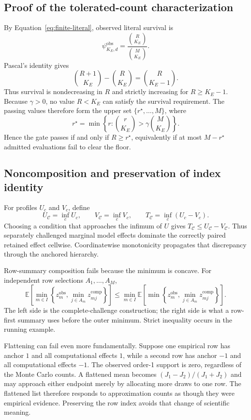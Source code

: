 \documentclass[11pt]{article}
\newcommand{\CSet}{\mathcal{C}}
\newcommand{\E}{\mathbb{E}}
\theoremstyle{remark}
\begin{document}
\subsection{Proof of the tolerated-count characterization}
\label{app:proof-count}

By Equation~\eqref{eq:finite-literal}, observed literal survival is
\[
\psi^{\mathrm{obs}}_{K_E,d}
=
\frac{\binom{R}{K_E}}{\binom{M}{K_E}}.
\]
Pascal's identity gives
\[
\binom{R+1}{K_E}-\binom{R}{K_E}
=
\binom{R}{K_E-1}.
\]
Thus survival is nondecreasing in $R$ and strictly increasing for
$R\geq K_E-1$. Because $\gamma>0$, no value $R<K_E$ can satisfy the survival
requirement. The passing values therefore form the upper set
$\{r^\star,\ldots,M\}$, where
\[
r^\star
=
\min\left\{
r:\binom{r}{K_E}>\gamma\binom{M}{K_E}
\right\}.
\]
Hence the gate passes if and only if $R\geq r^\star$, equivalently if at most
$M-r^\star$ admitted evaluations fail to clear the floor.

\subsection{Noncomposition and preservation of index identity}

For profiles $U_c$ and $V_c$, define
\[
U_\CSet=\inf_cU_c,
\qquad
V_\CSet=\inf_cV_c,
\qquad
T_\CSet=\inf_c(U_c-V_c).
\]
Choosing a condition that approaches the infimum of $U$ gives
$T_\CSet\leq U_\CSet-V_\CSet$. Thus separately challenged marginal model
effects dominate the correctly paired retained effect cellwise. Coordinatewise
monotonicity propagates that discrepancy through the anchored hierarchy.

Row-summary composition fails because the minimum is concave. For independent
row selections $A_1,\ldots,A_M$,
\[
\E\!\left[
\min_{m\in I}
\left\{
z_m^{\mathrm{obs}},
\min_{j\in A_m}z_{mj}^{\mathrm{comp}}
\right\}
\right]
\leq
\min_{m\in I}
\E\!\left[
\min\left\{
z_m^{\mathrm{obs}},
\min_{j\in A_m}z_{mj}^{\mathrm{comp}}
\right\}
\right].
\]
The left side is the complete-challenge construction; the right side is what a
row-first summary uses before the outer minimum. Strict inequality occurs in
the running example.

Flattening can fail even more fundamentally. Suppose one empirical row has
anchor $1$ and all computational effects $1$, while a second row has anchor
$-1$ and all computational effects $-1$. The observed order-1 support is zero,
regardless of the Monte Carlo counts. A flattened mean becomes
$(J_1-J_2)/(J_1+J_2)$ and may approach either endpoint merely by allocating
more draws to one row. The flattened list therefore responds to approximation
counts as though they were empirical evidence. Preserving the row index avoids
that change of scientific meaning.
\end{document}
